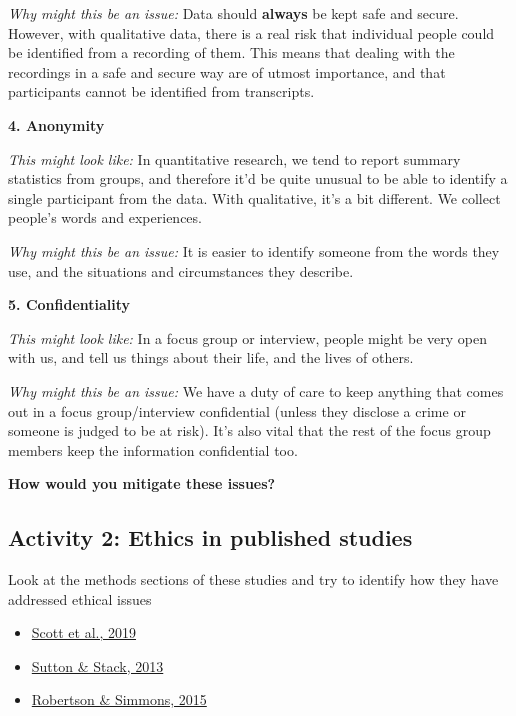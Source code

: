 \documentclass[
  english,
  letterpaper,
  DIV=11,
  numbers=noendperiod]{scrreprt}
\providecommand{\tightlist}{%
  \setlength{\itemsep}{0pt}\setlength{\parskip}{0pt}}
\begin{document}
\emph{Why might this be an issue:} Data should \textbf{always} be kept
safe and secure. However, with qualitative data, there is a real risk
that individual people could be identified from a recording of them.
This means that dealing with the recordings in a safe and secure way are
of utmost importance, and that participants cannot be identified from
transcripts.

\textbf{4. Anonymity }

\emph{This might look like:} In quantitative research, we tend to report
summary statistics from groups, and therefore it'd be quite unusual to
be able to identify a single participant from the data. With
qualitative, it's a bit different. We collect people's words and
experiences.

\emph{Why might this be an issue:} It is easier to identify someone from
the words they use, and the situations and circumstances they describe.

\textbf{5. Confidentiality}

\emph{This might look like:} In a focus group or interview, people might
be very open with us, and tell us things about their life, and the lives
of others.

\emph{Why might this be an issue:} We have a duty of care to keep
anything that comes out in a focus group/interview confidential (unless
they disclose a crime or someone is judged to be at risk). It's also
vital that the rest of the focus group members keep the information
confidential too.

\textbf{How would you mitigate these issues?}

\subsection{Activity 2: Ethics in published
studies}\label{activity-2-ethics-in-published-studies}

Look at the methods sections of these studies and try to identify how
they have addressed ethical issues

\begin{itemize}
\tightlist
\item
  \href{https://www.sciencedirect.com/science/article/pii/S2352721819301457\#s0010}{Scott
  et al., 2019}
\item
  \href{https://academic.oup.com/bjsw/article/43/3/596/1636960?login=true}{Sutton
  \& Stack, 2013}
\item
  \href{https://journals.sagepub.com/doi/pdf/10.1068/p7833}{Robertson \&
  Simmons, 2015}
\end{itemize}
\end{document}

